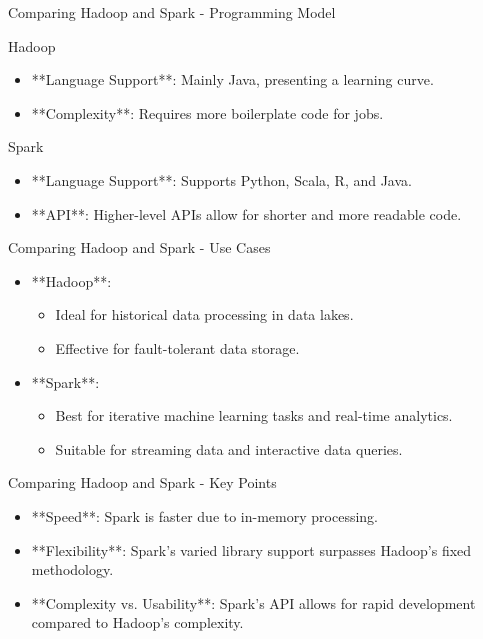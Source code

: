 \documentclass[aspectratio=169]{beamer}
\begin{document}
\begin{frame}[fragile]{Comparing Hadoop and Spark - Programming Model}
    \begin{block}{Hadoop}
        \begin{itemize}
            \item **Language Support**: Mainly Java, presenting a learning curve.
            \item **Complexity**: Requires more boilerplate code for jobs.
        \end{itemize}
    \end{block}

    \begin{block}{Spark}
        \begin{itemize}
            \item **Language Support**: Supports Python, Scala, R, and Java.
            \item **API**: Higher-level APIs allow for shorter and more readable code.
        \end{itemize}
    \end{block}
\end{frame}

\begin{frame}[fragile]{Comparing Hadoop and Spark - Use Cases}
    \begin{itemize}
        \item **Hadoop**:
            \begin{itemize}
                \item Ideal for historical data processing in data lakes.
                \item Effective for fault-tolerant data storage.
            \end{itemize}
        
        \item **Spark**:
            \begin{itemize}
                \item Best for iterative machine learning tasks and real-time analytics.
                \item Suitable for streaming data and interactive data queries.
            \end{itemize}
    \end{itemize}
\end{frame}

\begin{frame}[fragile]{Comparing Hadoop and Spark - Key Points}
    \begin{itemize}
        \item **Speed**: Spark is faster due to in-memory processing.
        \item **Flexibility**: Spark's varied library support surpasses Hadoop's fixed methodology.
        \item **Complexity vs. Usability**: Spark's API allows for rapid development compared to Hadoop's complexity.
    \end{itemize}
\end{frame}
\end{document}
